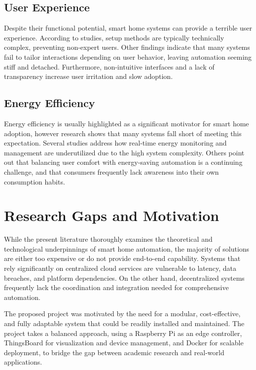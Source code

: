 \documentclass[a4paper,12pt]{report}
\begin{document}
\subsection{User Experience}
Despite their functional potential, smart home systems can provide a terrible user experience.  According to studies, setup methods are typically technically complex, preventing non-expert users\cite{sita2024development}\cite{bai2024research}.  Other findings indicate that many systems fail to tailor interactions depending on user behavior, leaving automation seeming stiff and detached\cite{elmi2023interoperable}.  Furthermore, non-intuitive interfaces and a lack of transparency increase user irritation and slow adoption.

\subsection{Energy Efficiency}
Energy efficiency is usually highlighted as a significant motivator for smart home adoption, however research shows that many systems fall short of meeting this expectation.  Several studies address how real-time energy monitoring and management are underutilized due to the high system complexity\cite{sita2024development}.  Others point out that balancing user comfort with energy-saving automation is a continuing challenge\cite{elmi2023interoperable}, and that consumers frequently lack awareness into their own consumption habits\cite{kaur2024evolution}.




\section{Research Gaps and Motivation}
While the present literature thoroughly examines the theoretical and technological underpinnings of smart home automation, the majority of solutions are either too expensive or do not provide end-to-end capability.  Systems that rely significantly on centralized cloud services are vulnerable to latency, data breaches, and platform dependencies.  On the other hand, decentralized systems frequently lack the coordination and integration needed for comprehensive automation.

 The proposed project was motivated by the need for a modular, cost-effective, and fully adaptable system that could be readily installed and maintained.  The project takes a balanced approach, using a Raspberry Pi as an edge controller, ThingsBoard for visualization and device management, and Docker for scalable deployment, to bridge the gap between academic research and real-world applications.
\end{document}
